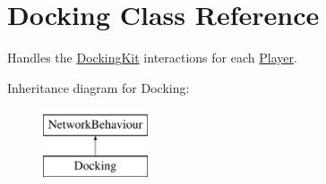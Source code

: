 \hypertarget{class_docking}{}\section{Docking Class Reference}
\label{class_docking}


Handles the \hyperlink{class_docking_kit}{Docking\+Kit} interactions for each \hyperlink{class_player}{Player}.  


Inheritance diagram for Docking\+:\begin{figure}[H]
\begin{center}
\leavevmode
\includegraphics[height=2.000000cm]{class_docking}
\end{center}
\end{figure}

